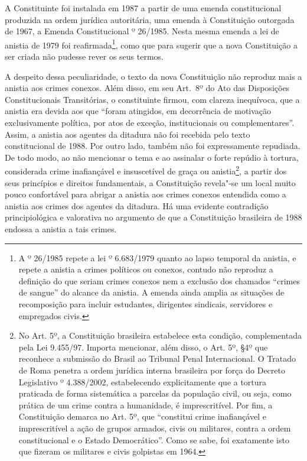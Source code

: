 A Constituinte foi instalada em 1987 a partir de uma emenda
constitucional produzida na ordem jurídica autoritária, uma emenda à
Constituição outorgada de 1967, a Emenda Constitucional º 26/1985.
Nesta mesma emenda a lei de anistia de 1979 foi reafirmada\footnote{A 
  º 26/1985 repete a lei º 6.683/1979 quanto ao lapso temporal da
  anistia, e repete a anistia a crimes políticos ou conexos, contudo não
  reproduz a definição do que seriam crimes conexos nem a exclusão dos
  chamados ``crimes de sangue'' do alcance da anistia. A emenda ainda
  amplia as situações de recomposição para incluir estudantes,
  dirigentes sindicais, servidores e empregados civis.}, como que para
sugerir que a nova Constituição a ser criada não pudesse rever os seus
termos.

A despeito dessa peculiaridade, o texto da nova Constituição não
reproduz mais a anistia aos crimes conexos. Além disso, em seu Art.~8º
do Ato das Disposições Constitucionais Transitórias, o constituinte
firmou, com clareza inequívoca, que a anistia era devida aos que ``foram
atingidos, em decorrência de motivação exclusivamente política, por atos
de exceção, institucionais ou complementares''. Assim, a anistia aos
agentes da ditadura não foi recebida pelo texto constitucional de 1988.
Por outro lado, também não foi expressamente repudiada. De todo modo, ao
não mencionar o tema e ao assinalar o forte repúdio à tortura,
considerada crime inafiançável e insuscetível de graça ou
anistia\footnote{No Art. 5º,  a Constituição brasileira estabelece
  esta condição, complementada pela Lei 9.455/97. Importa mencionar,
  além disso, o Art. 5º, §4º que reconhece a submissão do Brasil ao
  Tribunal Penal Internacional. O Tratado de Roma penetra a ordem
  jurídica interna brasileira por força do Decreto Legislativo º
  4.388/2002, estabelecendo explicitamente que a tortura praticada de
  forma sistemática a parcelas da população civil, ou seja, como prática
  de um crime contra a humanidade, é imprescritível. Por fim, a
  Constituição demarca no Art. 5º,  que ``constitui crime
      inafiançável e imprescritível a ação de grupos armados, civis ou
      militares, contra a ordem constitucional e o Estado Democrático''. Como
  se sabe, foi exatamente isto que fizeram os militares e civis
  golpistas em 1964.}, a partir dos seus princípios e direitos
fundamentais, a Constituição revela"-se um local muito pouco confortável
para abrigar a anistia aos crimes conexos entendida como a anistia aos
crimes dos agentes da ditadura. Há uma evidente contradição
principiológica e valorativa no argumento de que a Constituição
brasileira de 1988 endossa a anistia a tais crimes.

